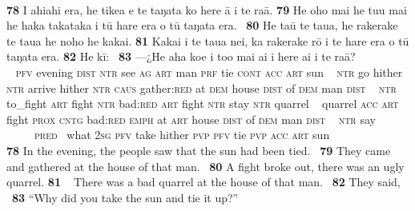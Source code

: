 ~

\bigskip\gll
\textbf{\textup{78}} I ahiahi era, he tike{\ꞌ}a e te taŋata ko here {\ꞌ}ā i te ra{\ꞌ}ā. \textbf{\textup{79}} He oho mai he tu{\ꞌ}u mai he haka takataka {\ꞌ}i tū hare era o tū taŋata era. ~\textbf{\textup{80}} He taū te tau{\ꞌ}a, he rakerake te tau{\ꞌ}a he noho he kakai. \textbf{\textup{81}} Kakai i te tau{\ꞌ}a nei, ka rakerake rō {\ꞌ}i te hare era o tū taŋata era. \textbf{\textup{82}} He kī: ~\textbf{\textup{83}} —¿He aha koe i to{\ꞌ}o mai ai i here ai i te ra{\ꞌ}ā?\\
~ \textsc{pfv} evening \textsc{dist} \textsc{ntr} see \textsc{ag} \textsc{art} man \textsc{prf} tie \textsc{cont} \textsc{acc} \textsc{art} sun  ~ \textsc{ntr} go hither \textsc{ntr} arrive hither \textsc{ntr} \textsc{caus} gather:\textsc{red} at \textsc{dem} house \textsc{dist} of \textsc{dem} man \textsc{dist} ~ \textsc{ntr} to\_fight \textsc{art} fight \textsc{ntr} bad:\textsc{red} \textsc{art} fight \textsc{ntr} stay \textsc{ntr} quarrel  ~ quarrel \textsc{acc} \textsc{art} fight \textsc{prox} \textsc{cntg} bad:\textsc{red} \textsc{emph} at \textsc{art} house \textsc{dist} of \textsc{dem} man \textsc{dist}  ~ \textsc{ntr} say ~ ~~~~~\textsc{pred}~ what \textsc{2sg} \textsc{pfv} take hither \textsc{pvp} \textsc{pfv} tie \textsc{pvp} \textsc{acc} \textsc{art} sun\\

\medskip\glt
\textbf{\textup{78}} In the evening, the people saw that the sun had been tied. ~\textbf{\textup{79}} They came and gathered at the house of that man. ~\textbf{\textup{80}} A fight broke out, there was an ugly quarrel. \textbf{\textup{81~~}}There was a bad quarrel at the house of that man. ~\textbf{\textup{82}} They said, ~\textbf{\textup{83}} “Why did you take the sun and tie it up?”


~


